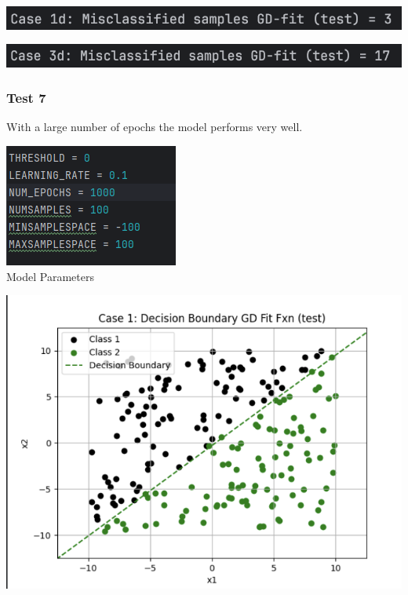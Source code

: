 \documentclass{article}
\begin{document}
\begin{center}
\includegraphics[scale=0.75]{../figs/T6.2.png} \\
\end{center}

\begin{center}
\includegraphics[scale=0.75]{../figs/T6.3.png} \\
\end{center}

\subsubsection{Test 7}

With a large number of epochs the model performs very well.
\begin{center}
\includegraphics[scale=0.75]{../figs/T3.1.png} \\
\caption{Model Parameters}
\end{center}

\begin{center}
\includegraphics[scale=0.75]{../figs/T7.1.png} \\
\end{center}
\end{document}
